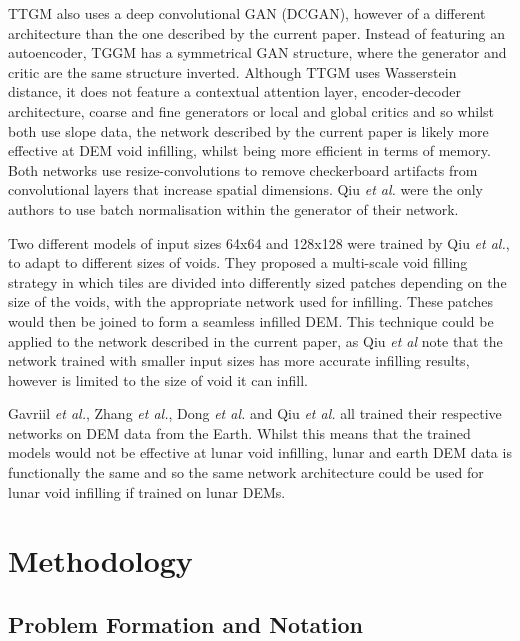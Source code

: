 \documentclass[twocolumn]{article}
\begin{document}
TTGM also uses a deep convolutional GAN (DCGAN), however of a different architecture than the one described by the current paper.
Instead of featuring an autoencoder, TGGM has a symmetrical GAN structure, where the generator and critic are the same structure inverted.
Although TTGM uses Wasserstein distance, it does not feature a contextual attention layer, encoder-decoder architecture, coarse and fine generators or local and global critics and so whilst both use slope data, the network described by the current paper is likely more effective at DEM void infilling, whilst being more efficient in terms of memory.
Both networks use resize-convolutions\autocite{aitkenCheckerboardArtifactFree2017}\autocite{odenaDeconvolutionCheckerboardArtifacts2016} to remove checkerboard artifacts from convolutional layers that increase spatial dimensions.
Qiu \emph{et al.} were the only authors to use batch normalisation within the generator of their network.

Two different models of input sizes 64x64 and 128x128 were trained by Qiu \emph{et al.}, to adapt to different sizes of voids.
They proposed a multi-scale void filling strategy in which tiles are divided into differently sized patches depending on the size of the voids, with the appropriate network used for infilling.
These patches would then be joined to form a seamless infilled DEM.
This technique could be applied to the network described in the current paper, as Qiu \emph{et al} note that the network trained with smaller input sizes has more accurate infilling results, however is limited to the size of void it can infill.

Gavriil \emph{et al.}, Zhang \emph{et al.}, Dong \emph{et al.} and Qiu \emph{et al.} all trained their respective networks on DEM data from the Earth.
Whilst this means that the trained models would not be effective at lunar void infilling, lunar and earth DEM data is functionally the same and so the same network architecture could be used for lunar void infilling if trained on lunar DEMs.


\section{Methodology}
\label{sec:org73e082f}

\subsection{Problem Formation and Notation}
\label{sec:org0ce6fe1}
\end{document}
